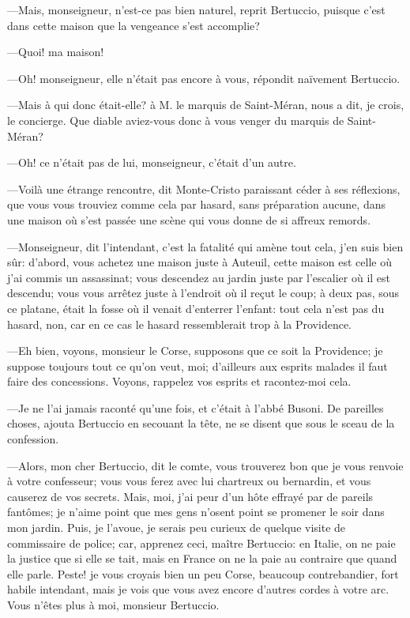 —Mais, monseigneur, n'est-ce pas bien naturel, reprit Bertuccio, puisque c'est dans cette maison que la vengeance s'est accomplie? 

—Quoi! ma maison! 

—Oh! monseigneur, elle n'était pas encore à vous, répondit naïvement Bertuccio. 

—Mais à qui donc était-elle? à M. le marquis de Saint-Méran, nous a dit, je crois, le concierge. Que diable aviez-vous donc à vous venger du marquis de Saint-Méran?  

—Oh! ce n'était pas de lui, monseigneur, c'était d'un autre. 

—Voilà une étrange rencontre, dit Monte-Cristo paraissant céder à ses réflexions, que vous vous trouviez comme cela par hasard, sans préparation aucune, dans une maison où s'est passée une scène qui vous donne de si affreux remords. 

—Monseigneur, dit l'intendant, c'est la fatalité qui amène tout cela, j'en suis bien sûr: d'abord, vous achetez une maison juste à Auteuil, cette maison est celle où j'ai commis un assassinat; vous descendez au jardin juste par l'escalier où il est descendu; vous vous arrêtez juste à l'endroit où il reçut le coup; à deux pas, sous ce platane, était la fosse où il venait d'enterrer l'enfant: tout cela n'est pas du hasard, non, car en ce cas le hasard ressemblerait trop à la Providence. 

—Eh bien, voyons, monsieur le Corse, supposons que ce soit la Providence; je suppose toujours tout ce qu'on veut, moi; d'ailleurs aux esprits malades il faut faire des concessions. Voyons, rappelez vos esprits et racontez-moi cela. 

—Je ne l'ai jamais raconté qu'une fois, et c'était à l'abbé Busoni. De pareilles choses, ajouta Bertuccio en secouant la tête, ne se disent que sous le sceau de la confession. 

—Alors, mon cher Bertuccio, dit le comte, vous trouverez bon que je vous renvoie à votre confesseur; vous vous ferez avec lui chartreux ou bernardin, et vous causerez de vos secrets. Mais, moi, j'ai peur d'un hôte effrayé par de pareils fantômes; je n'aime point que mes gens n'osent point se promener le soir dans mon jardin. Puis, je l'avoue, je serais peu curieux de quelque visite de commissaire de police; car, apprenez ceci, maître Bertuccio: en Italie, on ne paie la justice que si elle se tait, mais en France on ne la paie au contraire que quand elle parle. Peste! je vous croyais bien un peu Corse, beaucoup contrebandier, fort habile intendant, mais je vois que vous avez encore d'autres cordes à votre arc. Vous n'êtes plus à moi, monsieur Bertuccio. 

